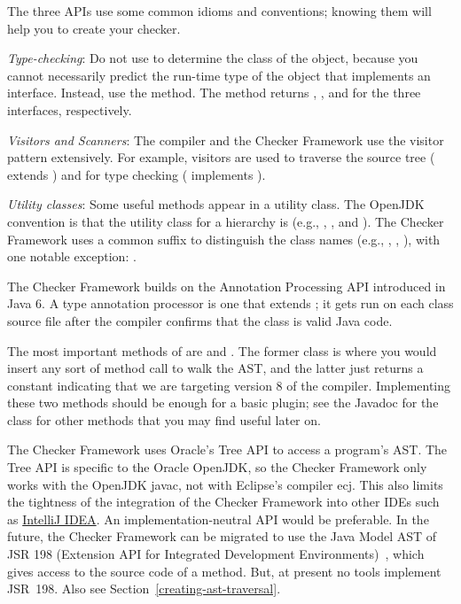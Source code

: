 The three APIs use some common idioms and conventions; knowing them will
help you to create your checker.

\emph{Type-checking}:
Do not use  to determine the class of the object,
because you cannot necessarily predict the run-time type of the object that
implements an interface.  Instead, use the  method.  The
method returns ,
, and 
for the three interfaces, respectively.

\emph{Visitors and Scanners}:
The compiler and the Checker Framework use the visitor pattern
extensively. For example, visitors are used to traverse the source tree
( extends
) and for type
checking ( implements
).

\emph{Utility classes}:
Some useful methods appear in a utility class.  The OpenJDK convention is that
the utility class for a  hierarchy is  (e.g.,
, , and
).  The Checker Framework uses a common
 suffix to distinguish the class names (e.g., ,
, ), with one
notable exception: .



The Checker Framework builds on the Annotation Processing API
introduced in Java 6.  A type annotation processor is one that extends
; it gets run on each class
source file after the compiler confirms that the class is valid Java code.

The most important methods of 
are  and . The former
class is where you would insert any sort of method call to walk the AST\@,
and the latter just returns a constant indicating that we are targeting
version 8 of the compiler. Implementing these two methods should be enough
for a basic plugin; see the Javadoc for the class for other methods that
you may find useful later on.

The Checker Framework uses Oracle's Tree API to access a program's AST\@.
The Tree API is specific to the Oracle OpenJDK, so the Checker Framework only
works with the OpenJDK javac, not with Eclipse's compiler ecj.
This also limits the tightness of
the integration of the Checker Framework into other IDEs such as \href{http://www.jetbrains.com/idea/}{IntelliJ IDEA}\@.
An implementation-neutral API would be preferable.
In the future, the Checker Framework
can be migrated to use the Java Model AST of JSR 198 (Extension API for
Integrated Development Environments)~\cite{JSR198}, which gives access to
the source code of a method.  But, at present no tools
implement JSR~198.  Also see Section~\ref{creating-ast-traversal}.



